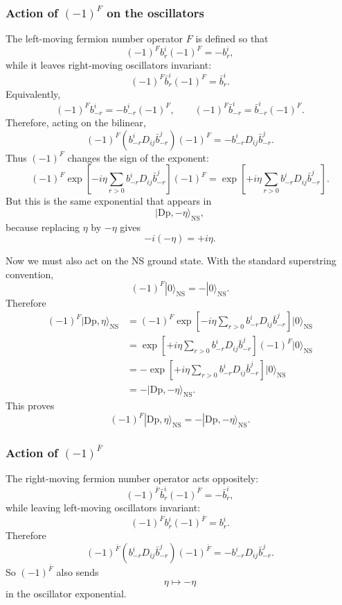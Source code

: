 \documentclass[
  10pt,
  a4paper,
  openany]{book}
\begin{document}
\subsubsection{\texorpdfstring{Action of \((-1)^F\) on the
oscillators}{Action of (-1)\^{}F on the oscillators}}\label{action-of--1f-on-the-oscillators}

The left-moving fermion number operator \(F\) is defined so that \[
(-1)^F b_r^i (-1)^F=-b_r^i,
\] while it leaves right-moving oscillators invariant: \[
(-1)^F\bar b_r^i(-1)^F=\bar b_r^i.
\] Equivalently, \[
(-1)^F b_{-r}^i
=
-b_{-r}^i(-1)^F,
\qquad
(-1)^F\bar b_{-r}^i
=
\bar b_{-r}^i(-1)^F.
\] Therefore, acting on the bilinear, \[
(-1)^F
\left(b^i_{-r}D_{ij}\bar b^j_{-r}\right)
(-1)^F
=
-
b^i_{-r}D_{ij}\bar b^j_{-r}.
\] Thus \((-1)^F\) changes the sign of the exponent: \[
(-1)^F
\exp\left[
-i\eta
\sum_{r>0}b^i_{-r}D_{ij}\bar b^j_{-r}
\right]
(-1)^F
=
\exp\left[
+i\eta
\sum_{r>0}b^i_{-r}D_{ij}\bar b^j_{-r}
\right].
\] But this is the same exponential that appears in \[
|\mathrm{Dp},-\eta\rangle_{\mathrm{NS}},
\] because replacing \(\eta\) by \(-\eta\) gives \[
-i(-\eta)=+i\eta.
\]

Now we must also act on the NS ground state. With the standard
superstring convention, \[
(-1)^F|0\rangle_{\mathrm{NS}}
=
-|0\rangle_{\mathrm{NS}}.
\] Therefore \[
\begin{aligned}
(-1)^F|\mathrm{Dp},\eta\rangle_{\mathrm{NS}}
&=
(-1)^F
\exp\left[
-i\eta
\sum_{r>0}b^i_{-r}D_{ij}\bar b^j_{-r}
\right]
|0\rangle_{\mathrm{NS}}\\
&=
\exp\left[
+i\eta
\sum_{r>0}b^i_{-r}D_{ij}\bar b^j_{-r}
\right]
(-1)^F|0\rangle_{\mathrm{NS}}\\
&=
-
\exp\left[
+i\eta
\sum_{r>0}b^i_{-r}D_{ij}\bar b^j_{-r}
\right]
|0\rangle_{\mathrm{NS}}\\
&=
-|\mathrm{Dp},-\eta\rangle_{\mathrm{NS}}.
\end{aligned}
\] This proves \[
\boxed{
(-1)^F|\mathrm{Dp},\eta\rangle_{\mathrm{NS}}
=
-|\mathrm{Dp},-\eta\rangle_{\mathrm{NS}}.
}
\]

\subsubsection{\texorpdfstring{Action of
\((-1)^{\bar F}\)}{Action of (-1)\^{}\{\textbackslash bar F\}}}\label{action-of--1bar-f}

The right-moving fermion number operator acts oppositely: \[
(-1)^{\bar F}\bar b_r^i(-1)^{\bar F}
=
-\bar b_r^i,
\] while leaving left-moving oscillators invariant: \[
(-1)^{\bar F}b_r^i(-1)^{\bar F}
=
b_r^i.
\] Therefore \[
(-1)^{\bar F}
\left(b^i_{-r}D_{ij}\bar b^j_{-r}\right)
(-1)^{\bar F}
=
-
b^i_{-r}D_{ij}\bar b^j_{-r}.
\] So \((-1)^{\bar F}\) also sends \[
\eta\mapsto -\eta
\] in the oscillator exponential.
\end{document}
